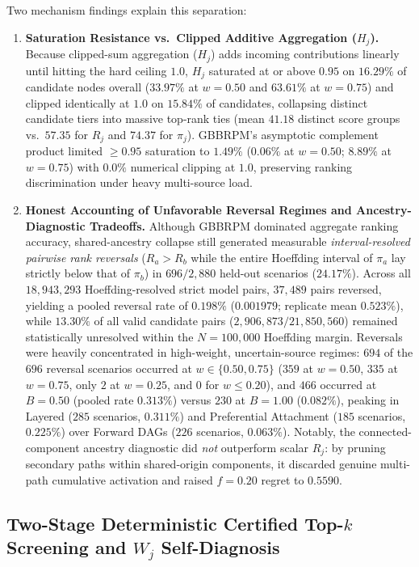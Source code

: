 Two mechanism findings explain this separation:
\begin{enumerate}[label=\arabic*.,leftmargin=*]
\item \textbf{Saturation Resistance vs.\ Clipped Additive Aggregation ($H_j$).}
Because clipped-sum aggregation ($H_j$) adds incoming contributions
linearly until hitting the hard ceiling $1.0$, $H_j$ saturated at or
above $0.95$ on $16.29\%$ of candidate nodes overall ($33.97\%$ at
$w=0.50$ and $63.61\%$ at $w=0.75$) and clipped identically at $1.0$ on
$15.84\%$ of candidates, collapsing distinct candidate tiers into
massive top-rank ties (mean $41.18$ distinct score groups vs.\ $57.35$
for $R_j$ and $74.37$ for $\pi_j$). GBBRPM's asymptotic complement
product limited $\ge 0.95$ saturation to $1.49\%$ ($0.06\%$ at $w=0.50$;
$8.89\%$ at $w=0.75$) with $0.0\%$ numerical clipping at $1.0$,
preserving ranking discrimination under heavy multi-source load.
\item \textbf{Honest Accounting of Unfavorable Reversal Regimes and
Ancestry-Diagnostic Tradeoffs.} Although GBBRPM dominated aggregate
ranking accuracy, shared-ancestry collapse still generated measurable
\emph{interval-resolved pairwise rank reversals} ($R_a > R_b$ while the
entire Hoeffding interval of $\pi_a$ lay strictly below that of $\pi_b$)
in $696/2,880$ held-out scenarios ($24.17\%$). Across all
$18,943,293$ Hoeffding-resolved strict model pairs, $37,489$ pairs
reversed, yielding a pooled reversal rate of $0.198\%$ ($0.001979$;
replicate mean $0.523\%$), while $13.30\%$ of all valid candidate pairs
($2,906,873 / 21,850,560$) remained statistically unresolved within the
$N=100{,}000$ Hoeffding margin. Reversals were heavily concentrated in
high-weight, uncertain-source regimes: $694$ of the $696$ reversal
scenarios occurred at $w \in \{0.50, 0.75\}$ ($359$ at $w=0.50$, $335$
at $w=0.75$, only $2$ at $w=0.25$, and $0$ for $w \le 0.20$), and
$466$ occurred at $B=0.50$ (pooled rate $0.313\%$) versus $230$ at
$B=1.00$ ($0.082\%$), peaking in Layered ($285$ scenarios, $0.311\%$)
and Preferential Attachment ($185$ scenarios, $0.225\%$) over Forward
DAGs ($226$ scenarios, $0.063\%$). Notably, the connected-component
ancestry diagnostic did \emph{not} outperform scalar $R_j$: by pruning
secondary paths within shared-origin components, it discarded genuine
multi-path cumulative activation and raised $f=0.20$ regret to $0.5590$.
\end{enumerate}

\subsection{Two-Stage Deterministic Certified Top-\texorpdfstring{$k$}{k} Screening and \texorpdfstring{$W_j$}{Wj} Self-Diagnosis}
\label{sec:v2-certified-screening}

